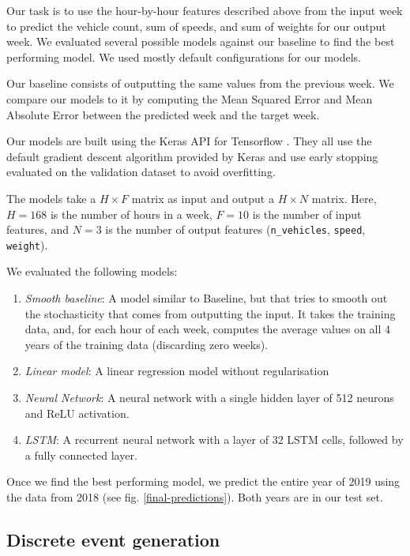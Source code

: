 \documentclass[10pt,conference,compsocconf]{IEEEtran}
\begin{document}
Our task is to use the hour-by-hour features described above from the input week to predict the
vehicle count, sum of speeds, and sum of weights for our output week. We evaluated several
possible models against our baseline to find the best performing model. We used mostly default 
configurations for our models. 

Our baseline consists of outputting the same values from the previous week. We compare 
our models to it by computing the Mean Squared Error and Mean Absolute Error between the 
predicted week and the target week. 

Our models are built using the Keras \cite{keras} API for Tensorflow \cite{tensorflow}. They 
all use the default gradient descent algorithm provided by Keras and use early stopping evaluated 
on the validation dataset to avoid overfitting.

The models take a $H \times F$ matrix as input and output a $H \times N$ matrix. Here, $H = 168$ 
is the number of hours in a week, $F = 10$ is the number of input features, and $N = 3$ is the
number of output features (\texttt{n\_vehicles}, \texttt{speed}, \texttt{weight}).

We evaluated the following models:

\begin{enumerate}
    \item \textit{Smooth baseline}: A model similar to Baseline, but that tries to smooth out the stochasticity that comes from outputting the input. It takes the training data, and, for each hour of each week, computes the average values on all 4 years of the training data (discarding zero weeks).
    \item \textit{Linear model}: A linear regression model without regularisation 
    \item \textit{Neural Network}: A neural network with a single hidden layer of 512 neurons and ReLU activation.
    \item \textit{LSTM}: A recurrent neural network with a layer of 32 LSTM cells, followed by a fully connected layer.
\end{enumerate}

Once we find the best performing model, we predict the entire year of 2019 using the data from 2018 (see fig. \ref{final-predictions}). Both years are in our test set.

\subsection{Discrete event generation}
\end{document}
